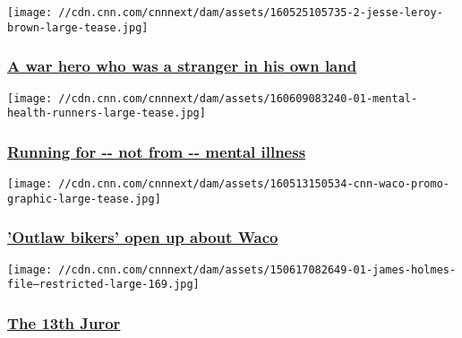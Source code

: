 \href{/2016/05/27/us/brown-hudner-devotion-korean-war/index.html}{}

\texttt{[image: //cdn.cnn.com/cnnnext/dam/assets/160525105735-2-jesse-leroy-brown-large-tease.jpg]}

\hypertarget{a-war-hero-who-was-a-stranger-in-his-own-land}{%
\subsubsection{\texorpdfstring{\href{/2016/05/27/us/brown-hudner-devotion-korean-war/index.html}{A
war hero who was a stranger in his own
land}}{A war hero who was a stranger in his own land}}\label{a-war-hero-who-was-a-stranger-in-his-own-land}}

\href{http://www.cnn.com/interactive/2016/06/health/mental-health-runners/}{}

\texttt{[image: //cdn.cnn.com/cnnnext/dam/assets/160609083240-01-mental-health-runners-large-tease.jpg]}

\hypertarget{running-for----not-from----mental-illness}{%
\subsubsection{\texorpdfstring{\href{http://www.cnn.com/interactive/2016/06/health/mental-health-runners/}{Running
for -\/- not from -\/- mental
illness}}{Running for -\/- not from -\/- mental illness}}\label{running-for----not-from----mental-illness}}

\href{/2016/05/15/us/waco-texas-biker-brawl-shootout-anniversary/index.html}{}

\texttt{[image: //cdn.cnn.com/cnnnext/dam/assets/160513150534-cnn-waco-promo-graphic-large-tease.jpg]}

\hypertarget{outlaw-bikers-open-up-about-waco}{%
\subsubsection{\texorpdfstring{\href{/2016/05/15/us/waco-texas-biker-brawl-shootout-anniversary/index.html}{'Outlaw
bikers' open up about
Waco}}{'Outlaw bikers' open up about Waco}}\label{outlaw-bikers-open-up-about-waco}}

\href{http://www.cnn.com/specials/us/the-13th-juror}{}

\texttt{[image: //cdn.cnn.com/cnnnext/dam/assets/150617082649-01-james-holmes-file---restricted-large-169.jpg]}

\hypertarget{the-13th-juror}{%
\subsubsection{\texorpdfstring{\href{http://www.cnn.com/specials/us/the-13th-juror}{The
13th Juror}}{The 13th Juror}}\label{the-13th-juror}}

